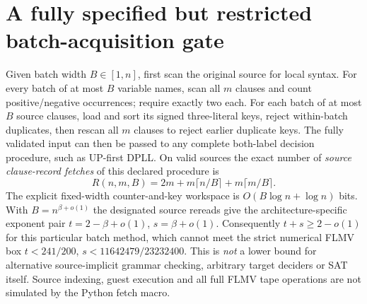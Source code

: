\documentclass[11pt]{article}
\begin{document}
\section{A fully specified but restricted batch-acquisition gate}
Given batch width $B\in[1,n]$, first scan the original source for local syntax. For every batch of at most $B$ variable names, scan all $m$ clauses and count positive/negative occurrences; require exactly two each. For each batch of at most $B$ source clauses, load and sort its signed three-literal keys, reject within-batch duplicates, then rescan all $m$ clauses to reject earlier duplicate keys. The fully validated input can then be passed to any complete both-label decision procedure, such as UP-first DPLL. On valid sources the exact number of \emph{source clause-record fetches} of this declared procedure is
\[
R(n,m,B)=2m+m\lceil n/B\rceil+m\lceil m/B\rceil.
\]
The explicit fixed-width counter-and-key workspace is $O(B\log n+\log n)$ bits. With $B=n^{\beta+o(1)}$ the designated source rereads give the architecture-specific exponent pair $t=2-\beta+o(1)$, $s=\beta+o(1)$. Consequently $t+s\ge2-o(1)$ for this particular batch method, which cannot meet the strict numerical FLMV box $t<241/200$, $s<11642479/23232400$. This is \emph{not} a lower bound for alternative source-implicit grammar checking, arbitrary target deciders or SAT itself. Source indexing, guest execution and all full FLMV tape operations are not simulated by the Python fetch macro.
\end{document}
